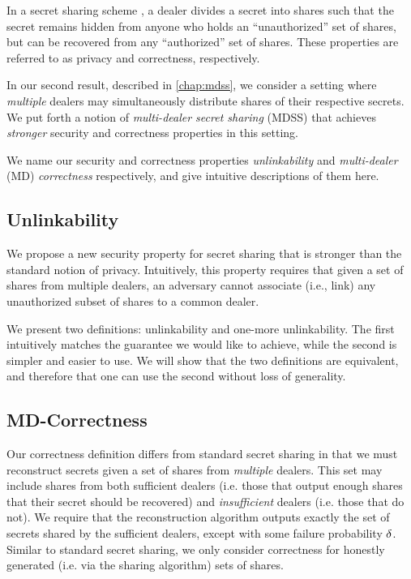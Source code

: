 
In a secret sharing scheme \cite{Shamir79}, a dealer divides a secret into shares such that the secret remains hidden from anyone who holds an ``unauthorized'' set of shares, but can be recovered from any ``authorized'' set of shares.
These properties are referred to as privacy and correctness, respectively.

In our second result, described in \cref{chap:mdss}, we consider a setting where {\em multiple} dealers may simultaneously distribute shares of their respective secrets.
We put forth a notion of {\em multi-dealer secret sharing} (MDSS) that achieves {\em stronger} security and correctness properties in this setting.

We name our security and correctness properties \emph{unlinkability} and \emph{multi-dealer} (MD) \emph{correctness} respectively, and give intuitive descriptions of them here.

\subsection{Unlinkability}
We propose a new security property for secret sharing that is stronger than the standard notion of privacy.
Intuitively, this property requires that given a set of shares from multiple dealers, an adversary cannot associate (i.e., link) any unauthorized subset of shares to a common dealer.

We present two definitions: unlinkability and one-more unlinkability. The first intuitively matches the  guarantee we would like to achieve, while the second is simpler and easier to use.
We will show that the two definitions are equivalent, and therefore that one can use the second without loss of generality.


\subsection{MD-Correctness}
Our correctness definition differs from standard secret sharing in that we must reconstruct secrets given a set of shares from \emph{multiple} dealers. This set may include shares from both sufficient dealers (i.e. those that output enough shares that their secret should be recovered) and \emph{insufficient} dealers (i.e. those that do not).
We require that the reconstruction algorithm outputs exactly the set of secrets shared by the sufficient dealers, except with some failure probability $\delta$.
Similar to standard secret sharing, we only consider correctness for honestly generated (i.e. via the sharing algorithm) sets of shares.


